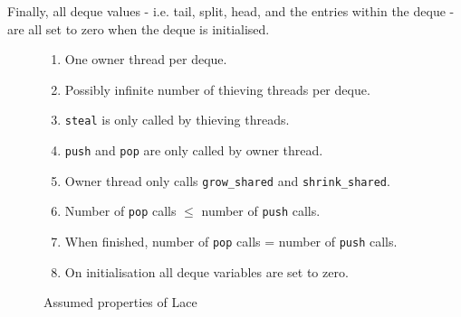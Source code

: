 \documentclass{sig-alternate-br}
\begin{document}
Finally, all deque values - i.e. tail, split, head, and the entries within the deque - are all set to zero when the deque is initialised.
\begin{figure}[h]
	\begin{enumerate}
		\setlength{\itemsep}{-3pt}
		\item One owner thread per deque.
		\item Possibly infinite number of thieving threads per deque.
	
		\item \texttt{steal} is only called by thieving threads.
		\item \texttt{push} and \texttt{pop} are only called by owner thread.
		\item Owner thread only calls \texttt{grow\_shared} and \texttt{shrink\_shared}.
	
		\item Number of \texttt{pop} calls $\leq$ number of \texttt{push} calls.
		\item When finished, number of \texttt{pop} calls = number of \texttt{push} calls.
	
		\item On initialisation all deque variables are set to zero.
	\end{enumerate}
	\caption{Assumed properties of Lace}
\end{figure}
\end{document}
